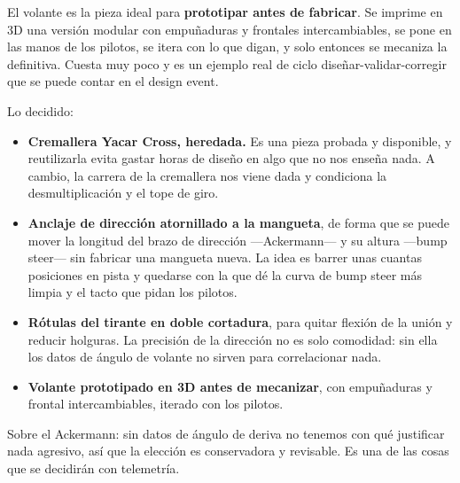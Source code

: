 \begin{clave}
El volante es la pieza ideal para \textbf{prototipar antes de fabricar}. Se
imprime en 3D una versión modular con empuñaduras y frontales intercambiables,
se pone en las manos de los pilotos, se itera con lo que digan, y solo entonces
se mecaniza la definitiva. Cuesta muy poco y es un ejemplo real de ciclo
diseñar-validar-corregir que se puede contar en el design event.
\end{clave}


\begin{caso}
Lo decidido:

\begin{itemize}
  \item \textbf{Cremallera Yacar Cross, heredada.} Es una pieza probada y
        disponible, y reutilizarla evita gastar horas de diseño en algo que no
        nos enseña nada. A cambio, la carrera de la cremallera nos viene dada y
        condiciona la desmultiplicación y el tope de giro.
  \item \textbf{Anclaje de dirección atornillado a la mangueta}, de forma que se
        puede mover la longitud del brazo de dirección ---Ackermann--- y su
        altura ---bump steer--- sin fabricar una mangueta nueva. La idea es
        barrer unas cuantas posiciones en pista y quedarse con la que dé la
        curva de bump steer más limpia y el tacto que pidan los pilotos.
  \item \textbf{Rótulas del tirante en doble cortadura}, para quitar flexión de
        la unión y reducir holguras. La precisión de la dirección no es solo
        comodidad: sin ella los datos de ángulo de volante no sirven para
        correlacionar nada.
  \item \textbf{Volante prototipado en 3D antes de mecanizar}, con empuñaduras y
        frontal intercambiables, iterado con los pilotos.
\end{itemize}

Sobre el Ackermann: sin datos de ángulo de deriva no tenemos con qué justificar
nada agresivo, así que la elección es conservadora y revisable. Es una de las
cosas que se decidirán con telemetría.

\medskip
{}
\end{caso}


